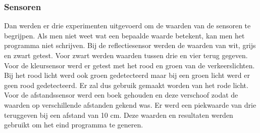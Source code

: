 \documentclass[a4paper,twoside,kulak]{kulakreport} %
\begin{document}
\subsubsection{Sensoren}

Dan werden er drie experimenten uitgevoerd om de waarden van de sensoren te begrijpen.
Als men niet weet wat een bepaalde waarde betekent, kan men het programma niet schrijven.
Bij de reflectiesensor werden de waarden van wit, grijs en zwart getest. 
Voor zwart werden waarden tussen drie en vier terug gegeven.  
Voor de kleursensor werd er getest met het rood en groen van de verkeerslichten.
Bij het rood licht werd ook groen gedetecteerd maar bij een groen licht werd er geen rood gedetecteerd.
Er zal dus gebruik gemaakt worden van het rode licht.
Voor de afstandssensor werd een boek gehouden en deze verschoof zodat de waarden op verschillende afstanden gekend was.
Er werd een piekwaarde van drie teruggeven bij een afstand van 10 cm. 
Deze waarden en resultaten werden gebruikt om het eind programma te generen.



\end{document}
